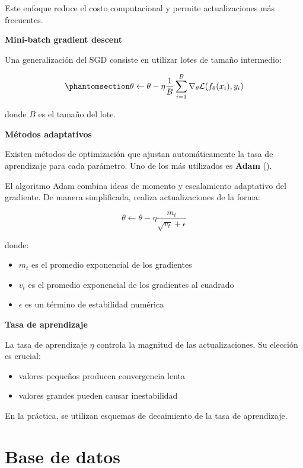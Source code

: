 \documentclass[
  spanish,
  us-letterpaper,
]{scrreprt}
\providecommand{\tightlist}{%
  \setlength{\itemsep}{0pt}\setlength{\parskip}{0pt}}
\theoremstyle{definition}
\theoremstyle{remark}
\begin{document}
Este enfoque reduce el costo computacional y permite actualizaciones más
frecuentes.

\textbf{Mini-batch gradient descent}

Una generalización del SGD consiste en utilizar lotes de tamaño
intermedio:

\begin{equation}\phantomsection\label{eq-minibatch}{
\theta \leftarrow \theta - \eta \frac{1}{B} \sum_{i=1}^{B} \nabla_\theta \mathcal{L}(f_\theta(x_i), y_i)
}\end{equation}

donde \(B\) es el tamaño del lote.

\textbf{Métodos adaptativos}

Existen métodos de optimización que ajustan automáticamente la tasa de
aprendizaje para cada parámetro. Uno de los más utilizados es
\textbf{Adam} ().

El algoritmo Adam combina ideas de momento y escalamiento adaptativo del
gradiente. De manera simplificada, realiza actualizaciones de la forma:

\[
\theta \leftarrow \theta - \eta \frac{m_t}{\sqrt{v_t} + \epsilon}
\]

donde:

\begin{itemize}
\tightlist
\item
  \(m_t\) es el promedio exponencial de los gradientes
\item
  \(v_t\) es el promedio exponencial de los gradientes al cuadrado
\item
  \(\epsilon\) es un término de estabilidad numérica
\end{itemize}

\textbf{Tasa de aprendizaje}

La tasa de aprendizaje \(\eta\) controla la magnitud de las
actualizaciones. Su elección es crucial:

\begin{itemize}
\tightlist
\item
  valores pequeños producen convergencia lenta
\item
  valores grandes pueden causar inestabilidad
\end{itemize}

En la práctica, se utilizan esquemas de decaimiento de la tasa de
aprendizaje.


\chapter{Base de datos}\label{base-de-datos}
\end{document}
